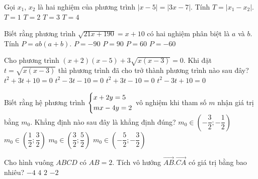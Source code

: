 \begin{ex}%
	Gọi $x_1$, $x_2$ là hai nghiệm của phương trình $|x-5|=|3x-7|$. Tính $T=\left|x_1-x_2\right|$.
	\choice
	{$T=1$}
	{\True $T=2$}
	{$T=3$}
	{$T=4$}
\end{ex}
\begin{ex}%
	Biết rằng phương trình $\sqrt{21x+190}=x+10$ có hai nghiệm phân biệt là $a$ và $b$. Tính $P=ab(a+b)$.
	\choice
	{\True $P=-90$}
	{$P=90$}
	{$P=60$}
	{$P=-60$}
\end{ex}
\begin{ex}%
	Cho phương trình $(x+2)(x-5)+3\sqrt{x(x-3)}=0$. Khi đặt $t=\sqrt{x(x-3)}$ thì phương trình đã cho trở thành phương trình nào sau đây?
	\choice
	{$t^2+3t+10=0$}
	{$t^2-3t-10=0$}
	{\True $t^2+3t-10=0$}	
	{$t^2-3t+10=0$}
\end{ex}
\begin{ex}%
	Biết rằng hệ phương trình $\left\{\begin{aligned}&x+2y=5\\ & mx -4y=2\end{aligned}\right.$ vô nghiệm khi tham số $m$ nhận giá trị bằng $m_0$. Khẳng định nào sau đây là khẳng định đúng?
	\choice
	{$m_0\in\left(-\dfrac{3}{2};-\dfrac{1}{2}\right)$}
	{$m_0\in\left(\dfrac{1}{2};\dfrac{3}{2}\right)$}
	{$m_0\in\left(\dfrac{3}{2};\dfrac{5}{2}\right)$}
	{\True $m_0\in\left(-\dfrac{5}{2};-\dfrac{3}{2}\right)$}
\end{ex}
\begin{ex}%
	Cho hình vuông $ABCD$ có $AB=2$. Tích vô hướng $\vec{AB}.\vec{CA}$ có giá trị bằng bao nhiêu?
	\choice
	{\True $-4$}
	{$4$}
	{$2$}
	{$-2$}
\end{ex}
